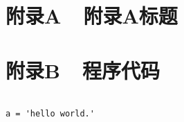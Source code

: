 
\chapter*{附录A\ \ 附录A标题}
   
\clearpage



\chapter*{附录B\ \ 程序代码}



\begin{lstlisting}

a = 'hello world.'

\end{lstlisting}


